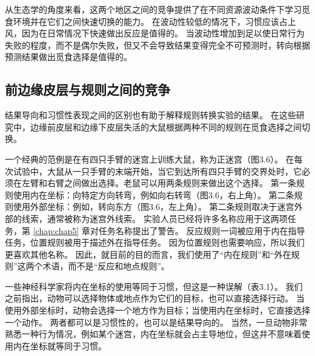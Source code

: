 从生态学的角度来看，这两个地区之间的竞争提供了在不同资源波动条件下学习觅食环境并在它们之间快速切换的能力。
在波动性较低的情况下，习惯应该占上风，因为在日常情况下快速做出反应是值得的。
当波动性增加到足以使日常行为失败的程度，而不是偶尔失败，但又不会导致结果变得完全不可预测时，转向根据预测结果做出觅食选择是值得的。\par



\subsection{前边缘皮层与规则之间的竞争}

结果导向和习惯性表现之间的区别也有助于解释规则转换实验的结果。
在这些研究中，边缘前皮层和边缘下皮层失活的大鼠根据两种不同的规则在觅食选择之间切换。\par


一个经典的范例是在有四只手臂的迷宫上训练大鼠，称为正迷宫（图3.6）。
在每次试验中，大鼠从一只手臂的末端开始，当它到达所有四只手臂的交界处时，它必须在左臂和右臂之间做出选择。老鼠可以用两条规则来做出这个选择。
第一条规则使用内在坐标：向特定方向转弯，例如向右转弯（图3.6，右上角）。
第二条规则使用外部坐标：例如，转向东方（图3.6，左上角）。
第二条规则取决于迷宫外部的线索，通常被称为迷宫外线索。
实验人员已经将许多名称应用于这两项任务，第 \ref{chap:chap5} 章对任务名称提出了警告。
反应规则一词被应用于内在指导任务，位置规则被用于描述外在指导任务。
因为位置规则也需要响应，所以我们更喜欢其他名称。
因此，就目前的目的而言，我们使用了“内在规则”和“外在规则”这两个术语，而不是“反应和地点规则”。\par


一些神经科学家将内在坐标的使用等同于习惯，但这是一种误解（表3.1）。
我们之前指出，动物可以选择物体或地点作为它们的目标，也可以直接选择行动。
当使用外部坐标时，动物会选择一个地方作为目标；当使用内在坐标时，它直接选择一个动作。
两者都可以是习惯性的，也可以是结果导向的。
当然，一旦动物非常熟悉一种行为情况，例如某个迷宫，内在坐标就会占主导地位，但这并不意味着使用内在坐标就等同于习惯。\par


